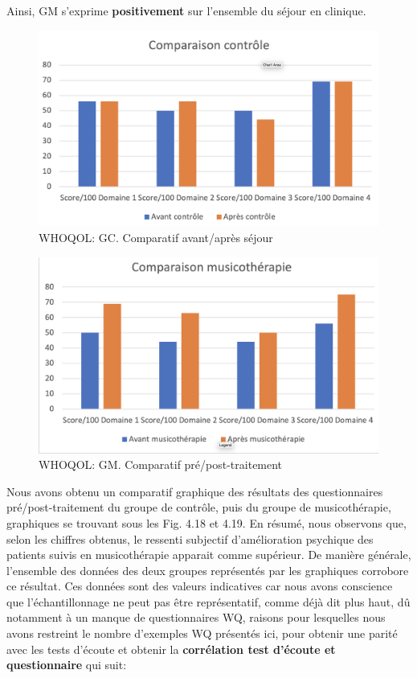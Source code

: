                  Ainsi,  GM s'exprime
                 \textbf{positivement}
                 sur l'ensemble du séjour en clinique.



\begin{figure}
\centering
\includegraphics[width=0.7\linewidth]{images/Compcontrole.png}
\caption[Schéma du déroulement]{WHOQOL:  GC. Comparatif avant/après séjour}

\end{figure}

\begin{figure}
\centering
\includegraphics[width=0.7\linewidth]{images/Compmusico.png}
\caption[Schéma du déroulement]{ WHOQOL: GM. Comparatif pré/post-traitement }

\end{figure}


Nous avons obtenu un comparatif graphique  des résultats des
                 questionnaires pré/post-traitement du groupe de contrôle,
                 puis du groupe de musicothérapie, graphiques se trouvant sous les Fig. 4.18 et 4.19.
       En résumé, nous observons que, selon les chiffres obtenus, le ressenti
       subjectif d'amélioration psychique
        des patients suivis en musicothérapie apparait comme
        supérieur.
        De manière générale, l'ensemble des données des deux groupes représentés
        par les graphiques corrobore ce résultat.
        Ces données sont des valeurs indicatives car nous avons conscience que l'échantillonnage ne
        peut pas être représentatif, comme déjà dit plus haut, dû
        notamment à un
        manque de
        questionnaires WQ, raisons pour lesquelles nous avons
        restreint le nombre d'exemples WQ présentés ici, pour obtenir
        une parité avec les tests d'écoute et obtenir la
        \textbf{corrélation test d'écoute et questionnaire} qui
        suit:

